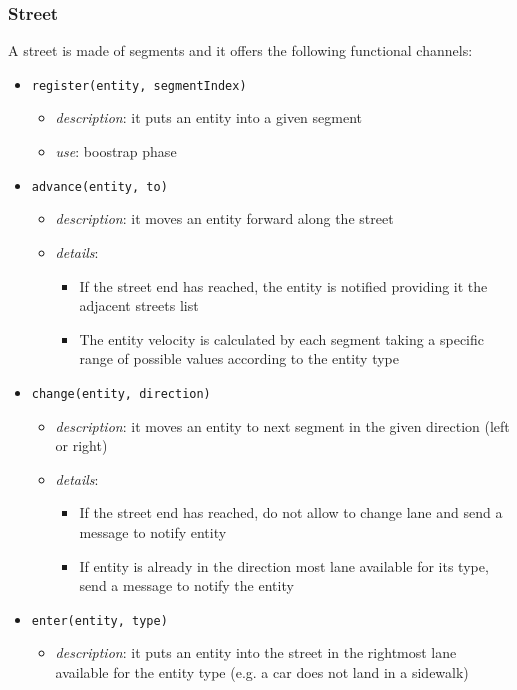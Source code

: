 \subsubsection{Street}
A street is made of segments and it offers the following functional channels:
\begin{itemize}
	\item \texttt{register(entity, segmentIndex)}
		\begin{itemize}
			\item \textit{description}: it puts an entity into a given segment
			\item \textit{use}: boostrap phase
		\end{itemize}
	\item \texttt{advance(entity, to)}
	\begin{itemize}
		\item \textit{description}: it moves an entity forward along the street
		\item \textit{details}: 
		\begin{itemize}
			\item If the street end has reached, the entity is notified providing it the adjacent streets list
			\item The entity velocity is calculated by each segment taking a specific range of possible values according to the entity type
		\end{itemize}
	\end{itemize}
	\item \texttt{change(entity, direction)}
	\begin{itemize}		
		\item \textit{description}: it moves an entity to next segment in the given direction (left or right)
		\item \textit{details}: 
		\begin{itemize}
			\item If the street end has reached, do not allow to change lane and send a message to notify entity
			\item If entity is already in the direction most lane available for its type, send a message to notify the entity
		\end{itemize}	
	\end{itemize}
	\item \texttt{enter(entity, type)}
	\begin{itemize}		
		\item \textit{description}: it puts an entity into the street in the rightmost lane available for the entity type (e.g. a car does not land in a sidewalk)

\end{itemize}
\end{itemize}
